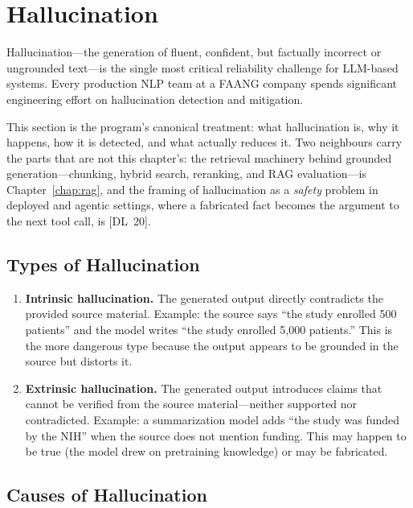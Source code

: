 \section{Hallucination}
\label{sec:hallucination}

Hallucination---the generation of fluent, confident, but factually incorrect or
ungrounded text---is the single most critical reliability challenge for
LLM-based systems.  Every production NLP team at a FAANG company spends
significant engineering effort on hallucination detection and mitigation.

This section is the program's canonical treatment: what hallucination is, why
it happens, how it is detected, and what actually reduces it.  Two neighbours
carry the parts that are not this chapter's: the retrieval machinery behind
grounded generation---chunking, hybrid search, reranking, and RAG
evaluation---is Chapter~\ref{chap:rag}, and the framing of hallucination as a
\emph{safety} problem in deployed and agentic settings, where a fabricated fact
becomes the argument to the next tool call, is [DL~20].

\subsection{Types of Hallucination}

\begin{enumerate}[label=\textbf{\arabic*.}]
    \item \textbf{Intrinsic hallucination.}  The generated output directly
    contradicts the provided source material.  Example: the source says
    ``the study enrolled 500 patients'' and the model writes ``the study
    enrolled 5,000 patients.''  This is the more dangerous type because the
    output appears to be grounded in the source but distorts it.

    \item \textbf{Extrinsic hallucination.}  The generated output introduces
    claims that cannot be verified from the source material---neither
    supported nor contradicted.  Example: a summarization model adds ``the
    study was funded by the NIH'' when the source does not mention funding.
    This may happen to be true (the model drew on pretraining knowledge) or
    may be fabricated.
\end{enumerate}

\subsection{Causes of Hallucination}

